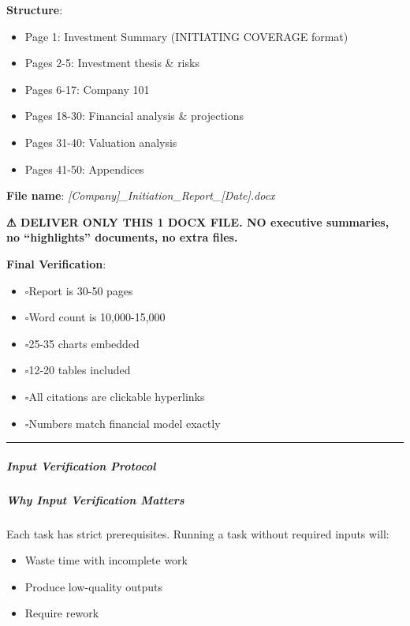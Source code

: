 \documentclass[11pt]{article}
\newcommand{\UncheckedBox}{$\square$}
\begin{document}
\textbf{Structure}:

\begin{itemize}[leftmargin=*,itemsep=2pt,topsep=2pt]
\item {} Page 1: Investment Summary (INITIATING COVERAGE format)
\item {} Pages 2-5: Investment thesis \& risks
\item {} Pages 6-17: Company 101
\item {} Pages 18-30: Financial analysis \& projections
\item {} Pages 31-40: Valuation analysis
\item {} Pages 41-50: Appendices
\end{itemize}

\textbf{File name}: \emph{[Company]\_\allowbreak{}Initiation\_\allowbreak{}Report\_\allowbreak{}[Date].docx}


\textbf{⚠ DELIVER ONLY THIS 1 DOCX FILE. NO executive summaries, no ``highlights'' documents, no extra files.}


\textbf{Final Verification}:

\begin{itemize}[leftmargin=*,itemsep=2pt,topsep=2pt]
\item {} \UncheckedBox Report is 30-50 pages
\item {} \UncheckedBox Word count is 10,000-15,000
\item {} \UncheckedBox 25-35 charts embedded
\item {} \UncheckedBox 12-20 tables included
\item {} \UncheckedBox All citations are clickable hyperlinks
\item {} \UncheckedBox Numbers match financial model exactly
\end{itemize}

\vspace{0.5em}\hrule\vspace{0.5em}

\subparagraph{Input Verification Protocol}\mbox{}\par

\subparagraph{Why Input Verification Matters}\mbox{}\par

Each task has strict prerequisites. Running a task without required inputs will:

\begin{itemize}[leftmargin=*,itemsep=2pt,topsep=2pt]
\item {} Waste time with incomplete work
\item {} Produce low-quality outputs
\item {} Require rework
\end{itemize}
\end{document}
